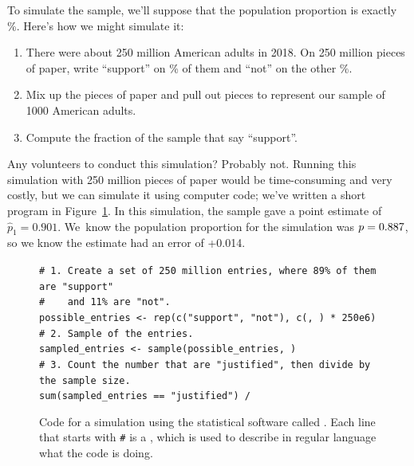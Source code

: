 To simulate the sample, we'll suppose that the population
proportion is exactly \pewsolarpollpercent{}\%.
Here's how we might simulate it:
\begin{enumerate}
\item There were about 250 million American adults in 2018.
    On 250 million pieces of paper, write ``support''
    on \pewsolarpollpercent{}\% of them and ``not'' on
    the other \pewsolarpollpercentcomplement{}\%.
\item Mix up the pieces of paper and pull out \pewsolarpollsize{}
    pieces to represent our sample of 1000 American adults.
\item Compute the fraction of the sample that say ``support''.
\end{enumerate}
Any volunteers to conduct this simulation? Probably not. Running
this simulation with 250 million pieces of paper would be
time-consuming and very costly, but we can simulate it
using computer code; we've written a short program in
Figure~\ref{solarPollSimulationCodeR}.
In this simulation, the sample gave a point estimate of
$\hat{p}_1 = 0.901$. We~know the population proportion
for the simulation was $p = 0.887{}$, so we know
the estimate had an error of +0.014.

\begin{figure}
\texttt{\# 1.\ Create a set of 250 million entries,
where 89\% of them are "support" \\
\#\ \ \ \ and 11\% are "not". \\
possible\_entries <- rep(c("support", "not"),
    c(\pewsolarpollprop{}, \pewsolarpollpropcomplement{}) * 250e6)\\
\# 2.\ Sample \pewsolarpollsize{} of the entries. \\
sampled\_entries <- sample(possible\_entries, \pewsolarpollsize{}) \\
\# 3.\ Count the number that are "justified", then divide
by the sample size. \\
sum(sampled\_entries == "justified") / \pewsolarpollsize{}}
\caption{Code for a simulation using the
    statistical software called \R{}.
    Each line that starts with \texttt{\#} is a ,
    which is used to describe in regular language what the
    code is doing.}
\label{solarPollSimulationCodeR}
\end{figure}

